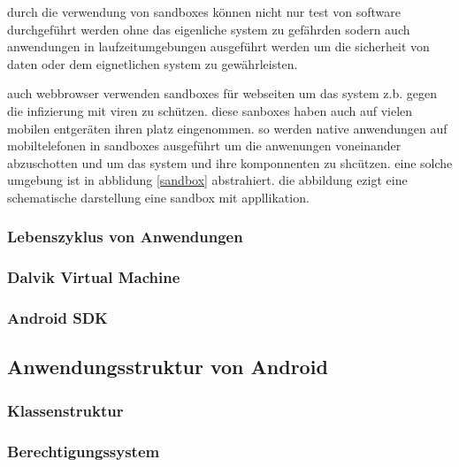 durch die verwendung von sandboxes können nicht nur test von software durchgeführt werden ohne das eigenliche system zu gefährden sodern auch anwendungen in laufzeitumgebungen ausgeführt werden um die sicherheit von daten oder dem eignetlichen system zu gewährleisten. 

auch webbrowser verwenden sandboxes für webseiten um das  system z.b. gegen die infizierung mit viren zu schützen. diese sanboxes haben auch auf vielen mobilen entgeräten ihren platz eingenommen. so werden native anwendungen auf mobiltelefonen in sandboxes ausgeführt um die anwenungen voneinander abzuschotten und um das system und ihre komponnenten zu shcützen. eine solche umgebung ist in abblidung \ref{sandbox} abstrahiert. die abbildung ezigt eine schematische darstellung eine sandbox mit appllikation.

\subsubsection{Lebenszyklus von Anwendungen}
\subsubsection{Dalvik Virtual Machine}
\subsubsection{Android SDK}
\label{sdk}
\subsection{Anwendungsstruktur von Android}
\subsubsection{Klassenstruktur}
\subsubsection{Berechtigungssystem}

